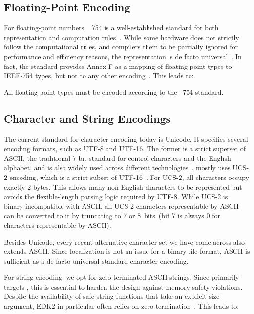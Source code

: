 \subsection{Floating-Point Encoding}

For floating-point numbers, ~754 is a well-established standard for both representation and computation rules~\cite{8766229}. While some hardware does not strictly follow the computational rules, and compilers them to be partially ignored for performance and efficiency reasons, the representation is de facto universal~\cite{gcc}. In fact, the  standard provides Annex F as a mapping of  floating-point types to IEEE-754 types, but not to any other encoding~\cite{ISO:2018:III}. This leads to:

\begin{requirement}
  All floating-point types must be encoded according to the ~754 standard.
\end{requirement}

\subsection{Character and String Encodings}

The current standard for character encoding today is Unicode. It specifies several encoding formats, such as UTF-8 and UTF-16. The former is a strict superset of \gls{ASCII}, the traditional $7$-bit standard for control characters and the English alphabet, and is also widely used across different technologies~\cite{UCS}.  mostly uses UCS-2 encoding, which is a strict subset of UTF-16~\cite{uefi-spec,UCS}. For UCS-2, all characters occupy exactly $2$ \glspl{byte}. This allows many non-English characters to be represented but avoids the flexible-length parsing logic required by UTF-8. While UCS-2 is binary-incompatible with \gls{ASCII}, all UCS-2 characters representable by \gls{ASCII} can be converted to it by truncating to $7$ or $8$~bits~(bit 7 is always 0 for characters representable by \gls{ASCII}).

Besides Unicode, every recent alternative character set we have come across also extends \gls{ASCII}. Since localization is not an issue for a binary file format, \gls{ASCII} is sufficient as a de-facto universal standard character encoding.

For string encoding, we opt for zero-terminated \gls{ASCII} strings. Since  primarily targets , this is essential to harden the design against memory safety violations. Despite the availability of safe string functions that take an explicit size argument, \gls{EDK2} in particular often relies on zero-termination~\cite{edk2}. This leads to:

